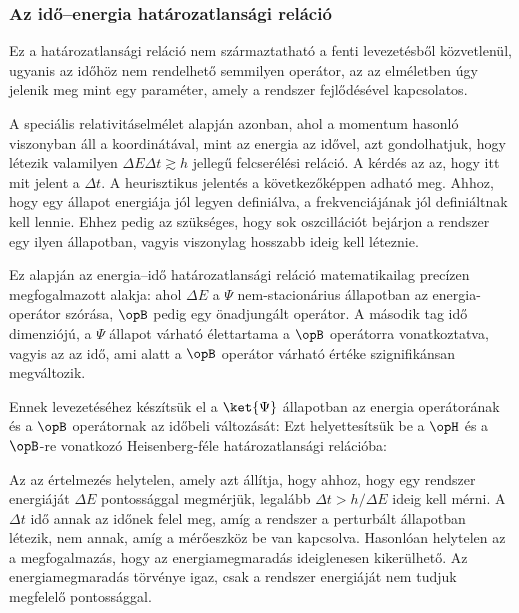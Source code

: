   \subsubsection*{Az idő--energia határozatlansági reláció}\label{ss:energiaidohatarozatlansag}
   
   Ez a határozatlansági reláció nem származtatható a fenti levezetésből közvetlenül, ugyanis az időhöz nem rendelhető semmilyen operátor,  az az elméletben úgy jelenik meg mint egy paraméter, amely a rendszer fejlődésével kapcsolatos. 
   
   A speciális relativitáselmélet alapján azonban, ahol a momentum hasonló viszonyban áll a koordinátával, mint az energia az idővel, azt gondolhatjuk, hogy létezik valamilyen $\Delta E\Delta t\gtrsim h$ jellegű felcserélési reláció.
   A kérdés az az, hogy itt mit jelent a $\Delta t$.
   A heurisztikus jelentés a következőképpen adható meg.
   Ahhoz, hogy egy állapot energiája jól legyen definiálva, a frekvenciájának jól definiáltnak kell lennie.
   Ehhez pedig az szükséges, hogy sok oszcillációt bejárjon a rendszer egy ilyen állapotban, vagyis viszonylag hosszabb ideig kell léteznie. 
   
   Ez alapján az energia--idő határozatlansági reláció matematikailag precízen megfogalmazott alakja: 
   ahol $\Delta E$ a $\Psi$ nem-stacionárius állapotban az energia-operátor szórása, $\opB$ pedig egy önadjungált operátor.
   A második tag idő dimenziójú, a $\Psi$ állapot várható élettartama a $\opB$ operátorra vonatkoztatva, vagyis az az idő, ami alatt a $\opB$ operátor várható értéke szignifikánsan megváltozik.
   
   Ennek levezetéséhez készítsük el a $\ket{\Psi}$ állapotban az energia operátorának és a $\opB$ operátornak az időbeli változását:
   Ezt helyettesítsük be a $\opH$ és a $\opB$-re vonatkozó Heisenberg-féle határozatlansági relációba:
   
   Az az értelmezés helytelen, amely azt állítja, hogy ahhoz, hogy egy rendszer energiáját $\Delta E$ pontossággal megmérjük, legalább $\Delta t>h/\Delta E$ ideig kell mérni.
   A $\Delta t$ idő annak az időnek felel meg, amíg a rendszer a perturbált állapotban létezik, nem annak, amíg a mérőeszköz be van kapcsolva.
   Hasonlóan helytelen az a megfogalmazás, hogy az energiamegmaradás ideiglenesen kikerülhető.
   Az energiamegmaradás törvénye igaz, csak a rendszer energiáját nem tudjuk megfelelő pontossággal.
    
